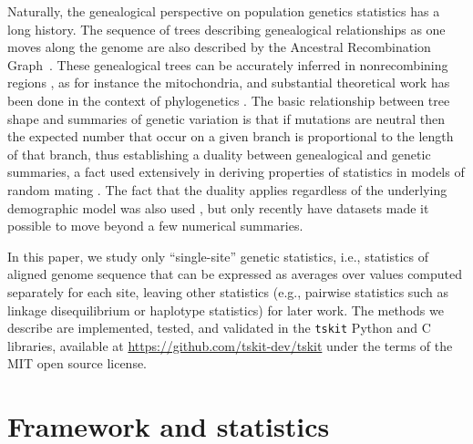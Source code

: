 \documentclass{article}
\newcommand{\tskit}{{\texttt{tskit}}}
\begin{document}
Naturally, the genealogical perspective on population genetics statistics has a long history.
The sequence of trees describing genealogical relationships as one moves along the genome
are also described by the Ancestral Recombination
Graph~\citep{griffiths1991two,griffiths1996ancestral,rasmussen2014genome}.
These genealogical trees can be accurately inferred in nonrecombining regions
\citep{felsenstein2004inferring},
as for instance the mitochondria,
and substantial theoretical work has been done in the context of phylogenetics \citep{semple2003phylogenetics}.
The basic relationship between tree shape and summaries of genetic variation
is that if mutations are neutral then the expected number that occur on a given branch
is proportional to the length of that branch,
thus establishing a duality between genealogical and genetic summaries,
a fact used extensively in deriving properties of statistics in models of random mating
\citep[e.g.][]{tajima1983evolutionary,tavare1984lineofdescent,fu1995statistical}.
The fact that the duality applies regardless of the underlying demographic model was also used
\citep[e.g.][]{gillespie1979evolutionary,hudson1983properties,slatkin1991inbreeding,mcvean2002genealogical,ralph2019empirical},
but only recently have datasets made it possible to move beyond a few numerical summaries.

In this paper, we study only ``single-site'' genetic statistics,
i.e., statistics of aligned genome sequence that can be expressed as averages over values computed
separately for each site,
leaving other statistics (e.g., pairwise statistics such as linkage disequilibrium
or haplotype statistics) for later work.
The methods we describe are implemented, tested, and validated in the \tskit{}
Python and C libraries, available at \url{https://github.com/tskit-dev/tskit}
under the terms of the MIT open source license.


\section*{Framework and statistics}
\end{document}
